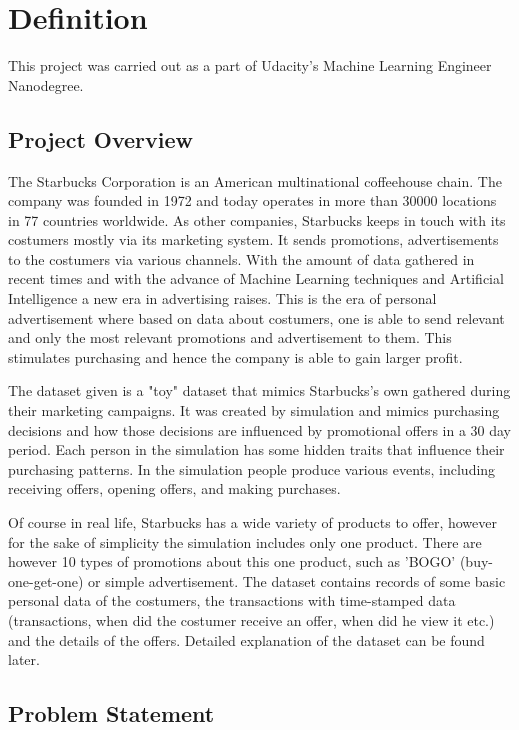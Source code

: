 \section{Definition} \label{sec1}

This project was carried out as a part of Udacity's Machine Learning Engineer Nanodegree.

\subsection{Project Overview} \label{sec1.1}

The Starbucks Corporation is an American multinational coffeehouse chain. The company was founded in 1972 and today operates in more than 30000 locations in 77 countries worldwide. As other companies, Starbucks keeps in touch with its costumers mostly via its marketing system. It sends promotions, advertisements to the costumers via various channels. With the amount of data gathered in recent times and with the advance of Machine Learning techniques and Artificial Intelligence a new era in advertising raises. This is the era of personal advertisement where based on data about costumers, one is able to send relevant and only the most relevant promotions and advertisement to them. This stimulates purchasing and hence the company is able to gain larger profit.

The dataset given is a "toy" dataset that mimics Starbucks's own gathered during their marketing campaigns. It was created by simulation and mimics purchasing decisions and how those decisions are influenced by promotional offers in a 30 day period. Each person in the simulation has some hidden traits that influence their purchasing patterns. In the simulation people produce various events, including receiving offers, opening offers, and making purchases.

Of course in real life, Starbucks has a wide variety of products to offer, however for the sake of simplicity the simulation includes only one product. There are however 10 types of promotions about this one product, such as 'BOGO' (buy-one-get-one) or simple advertisement. The dataset contains records of some basic personal data of the costumers, the transactions with time-stamped data (transactions, when did the costumer receive an offer, when did he view it etc.) and the details of the offers. Detailed explanation of the dataset can be found later.

\subsection{Problem Statement} \label{sec1.2}

